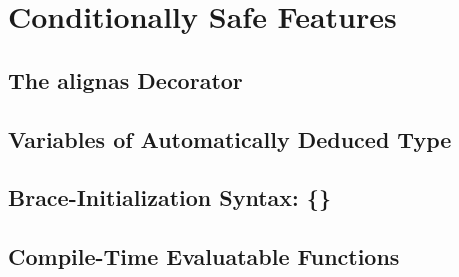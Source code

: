 
\chapter[Conditionally Safe Features]{Conditionally Safe Features}\label{ch-conditional}

\renewcommand{\cppxx}{C++11}

\newpage
{}
\section[{\tt alignas}]{The {\SecCode alignas} Decorator}\label{alignas}


\newpage
%
\section[{\tt auto} Variables]{Variables of Automatically Deduced Type}\label{auto}\label{auto-feature}


\newpage
 \section[Braced Init]{Brace-Initialization Syntax: {\SecCode \{\}}}\label{bracedinit}


\newpage
\section[{\tt constexpr} Functions]{Compile-Time Evaluatable Functions}\label{constexprfunc}


